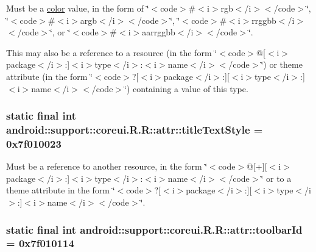 Must be a \hyperlink{classandroid_1_1support_1_1coreui_1_1_r_1_1color}{color} value, in the form of \char`\"{}$<$code$>$\#$<$i$>$rgb$<$/i$>$$<$/code$>$\char`\"{}, \char`\"{}$<$code$>$\#$<$i$>$argb$<$/i$>$$<$/code$>$\char`\"{}, \char`\"{}$<$code$>$\#$<$i$>$rrggbb$<$/i$>$$<$/code$>$\char`\"{}, or \char`\"{}$<$code$>$\#$<$i$>$aarrggbb$<$/i$>$$<$/code$>$\char`\"{}. 

This may also be a reference to a resource (in the form \char`\"{}$<$code$>$@\mbox{[}$<$i$>$package$<$/i$>$:\mbox{]}$<$i$>$type$<$/i$>$:$<$i$>$name$<$/i$>$$<$/code$>$\char`\"{}) or theme attribute (in the form \char`\"{}$<$code$>$?\mbox{[}$<$i$>$package$<$/i$>$:\mbox{]}\mbox{[}$<$i$>$type$<$/i$>$:\mbox{]}$<$i$>$name$<$/i$>$$<$/code$>$\char`\"{}) containing a value of this type. \hypertarget{classandroid_1_1support_1_1coreui_1_1_r_1_1attr_84000c8f46ba7366050bb28e0adbfe7f}{
\subsubsection[{titleTextStyle}]{\setlength{\rightskip}{0pt plus 5cm}static final int android::support::coreui.R.R::attr::titleTextStyle = 0x7f010023}}
\label{classandroid_1_1support_1_1coreui_1_1_r_1_1attr_84000c8f46ba7366050bb28e0adbfe7f}


Must be a reference to another resource, in the form \char`\"{}$<$code$>$@\mbox{[}+\mbox{]}\mbox{[}$<$i$>$package$<$/i$>$:\mbox{]}$<$i$>$type$<$/i$>$:$<$i$>$name$<$/i$>$$<$/code$>$\char`\"{} or to a theme attribute in the form \char`\"{}$<$code$>$?\mbox{[}$<$i$>$package$<$/i$>$:\mbox{]}\mbox{[}$<$i$>$type$<$/i$>$:\mbox{]}$<$i$>$name$<$/i$>$$<$/code$>$\char`\"{}. \hypertarget{classandroid_1_1support_1_1coreui_1_1_r_1_1attr_d22ac87bac24e454e8f3dd4c21ce5f5a}{
\subsubsection[{toolbarId}]{\setlength{\rightskip}{0pt plus 5cm}static final int android::support::coreui.R.R::attr::toolbarId = 0x7f010114}}
\label{classandroid_1_1support_1_1coreui_1_1_r_1_1attr_d22ac87bac24e454e8f3dd4c21ce5f5a}


